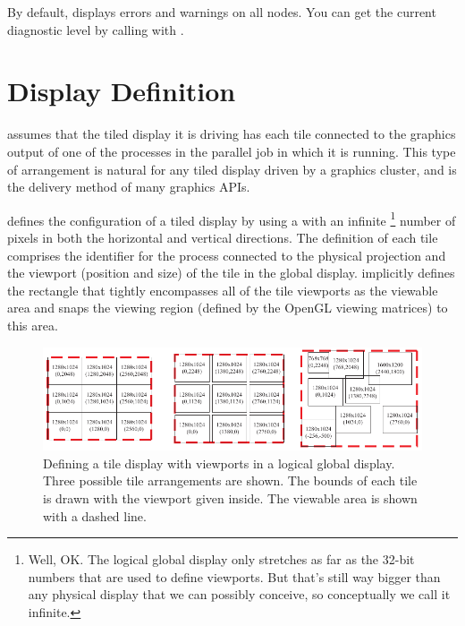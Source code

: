 By default, \IceT displays errors and warnings on all nodes.  You can get
the current diagnostic level by calling  with
.



\section{Display Definition}
\label{sec:Basic_Usage:Display_Definition}


\IceT assumes that the tiled display it is driving has each tile connected
to the graphics output of one of the processes in the parallel job in which
it is running.  This type of arrangement is natural for any tiled display
driven by a graphics cluster, and is the delivery method of many graphics
APIs. %

\IceT defines the configuration of a tiled display by using a
 with an infinite \footnote{Well, OK.  The logical global display
  only stretches as far as the 32-bit numbers that are used to define
  viewports.  But that's still way bigger than any physical display that we
  can possibly conceive, so conceptually we call it infinite.} number of
pixels in both the horizontal and vertical directions.  The definition of
each tile comprises the identifier for the process connected to the
physical projection and the viewport (position and size) of the tile in the
global display.  \IceT implicitly defines the rectangle that tightly
encompasses all of the tile viewports as the viewable area and snaps the
viewing region (defined by the OpenGL viewing matrices) to this area.

\begin{figure}
  \centering
  \includegraphics{images/ExampleTileConfig}
  \caption{Defining a tile display with viewports in a logical global
    display.  Three possible tile arrangements are shown.  The bounds of
    each tile is drawn with the viewport given inside.  The viewable area
    is shown with a dashed line.}
  \label{fig:BasicUsage:tile_layout}
\end{figure}

